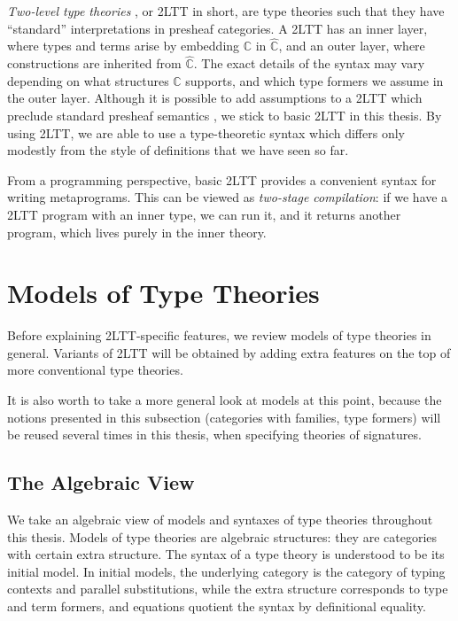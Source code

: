 \documentclass[12pt,a4paper,twoside,openany]{book}
\theoremstyle{remark}
\theoremstyle{definition}
\theoremstyle{theorem}
\newcommand{\mbb}[1]{\mathbb{#1}}
\newcommand{\mbbC}{\mbb{C}}
\begin{document}
\emph{Two-level type theories} \cite{twolevel}, or 2LTT in short, are type
theories such that they have ``standard'' interpretations in presheaf
categories. A 2LTT has an inner layer, where types and terms arise by embedding
$\mbbC$ in $\hat{\mbbC}$, and an outer layer, where constructions are inherited
from $\hat{\mbbC}$. The exact details of the syntax may vary depending on what
structures $\mbbC$ supports, and which type formers we assume in the outer
layer. Although it is possible to add assumptions to a 2LTT which preclude
standard presheaf semantics \cite[Section 2.4.]{twolevel}, we stick to basic
2LTT in this thesis. By using 2LTT, we are able to use a type-theoretic syntax
which differs only modestly from the style of definitions that we have seen so
far.

From a programming perspective, basic 2LTT provides a convenient syntax for
writing metaprograms. This can be viewed as \emph{two-stage compilation}: if we
have a 2LTT program with an inner type, we can run it, and it returns another
program, which lives purely in the inner theory.

\section{Models of Type Theories}
\label{sec:models-of-tts}

Before explaining 2LTT-specific features, we review models of type theories
in general. Variants of 2LTT will be obtained by adding extra features on the
top of more conventional type theories.

It is also worth to take a more general look at models at this point, because
the notions presented in this subsection (categories with families, type
formers) will be reused several times in this thesis, when specifying theories
of signatures.

\subsection{The Algebraic View}

We take an algebraic view of models and syntaxes of type theories throughout
this thesis. Models of type theories are algebraic structures: they are
categories with certain extra structure. The syntax of a type theory is
understood to be its initial model. In initial models, the underlying category
is the category of typing contexts and parallel substitutions, while the extra
structure corresponds to type and term formers, and equations quotient the
syntax by definitional equality.
\end{document}
